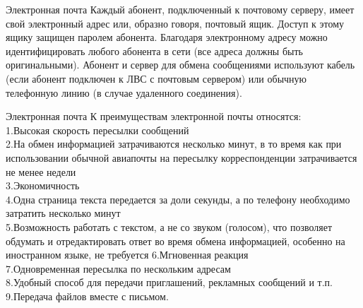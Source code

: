 \documentclass{beamer}
\begin{document}
\begin{frame}{Электронная почта}
Каждый абонент, подключенный к почтовому серверу, имеет свой электронный адрес или, образно говоря, почтовый ящик. Доступ к этому ящику защищен паролем абонента. Благодаря электронному адресу можно идентифицировать любого абонента в сети (все адреса должны быть оригинальными). Абонент и сервер для обмена сообщениями используют кабель (если абонент подключен к ЛВС с почтовым сервером) или обычную телефонную линию (в случае удаленного соединения).  
\end{frame}


\begin{frame}{Электронная почта}
К преимуществам электронной почты относятся:\\
1.Высокая скорость пересылки сообщений\\
2.На обмен информацией затрачиваются несколько минут, в то время как при использовании обычной авиапочты на пересылку корреспонденции затрачивается не менее недели\\
3.Экономичность\\
4.Одна страница текста передается за доли секунды, а по телефону необходимо затратить несколько минут\\
5.Возможность работать с текстом, а не со звуком (голосом), что позволяет обдумать и отредактировать ответ во время обмена информацией, особенно на иностранном языке, не требуется 6.Мгновенная реакция\\
7.Одновременная пересылка по нескольким адресам\\
8.Удобный способ для передачи приглашений, рекламных сообщений и т.п.\\
9.Передача файлов вместе с письмом.
\end{frame}
\end{document}
